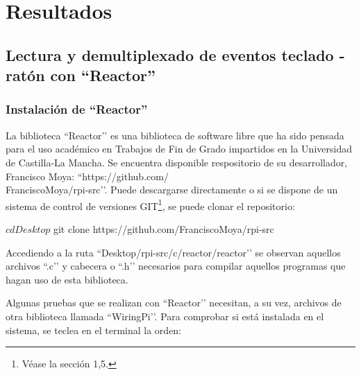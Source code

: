 \chapter{Resultados} \label{cap4}



\newpage

\section{Lectura y demultiplexado de eventos teclado - ratón con ``Reactor''} \label{s4_1}

\subsection{Instalación de ``Reactor''} \label{s4_1_1}

La biblioteca ``Reactor’’ es una biblioteca de software libre que ha sido pensada para el uso académico en Trabajos de Fin de Grado impartidos en la Universidad de Castilla-La Mancha. Se encuentra disponible respositorio de su desarrollador, Francisco Moya: ``https://github.com/\\FranciscoMoya/rpi-src’’. Puede descargarse directamente o si se dispone de un sistema de control de versiones GIT\footnote{Véase la sección 1,5.}, se puede clonar el repositorio: \\

\begin{bashcode}
$ cd Desktop
$ git clone https://github.com/FranciscoMoya/rpi-src
\end{bashcode}

Accediendo a la ruta ``Desktop/rpi-src/c/reactor/reactor’’ se observan aquellos archivos ``.c’’ y cabecera o ``.h’’ necesarios para compilar aquellos programas que hagan uso de esta biblioteca.

Algunas pruebas que se realizan con ``Reactor’’ necesitan, a su vez, archivos de otra biblioteca llamada ``WiringPi’’. Para comprobar si está instalada en el sistema, se teclea en el terminal la orden:\\

